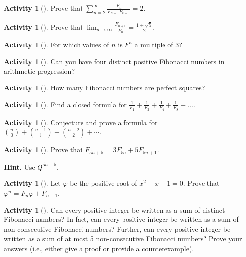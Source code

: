 \documentclass[10pt,]{book}
\theoremstyle{plain}
\theoremstyle{definition}
\theoremstyle{definition}
\theoremstyle{definition}
\newtheorem{activity}[project]{Activity}
\numberwithin{equation}{chapter}
\begin{document}
\begin{activity}[]\label{activity-155}
\hypertarget{p-978}{}%
Prove that \(\sum_{n = 2}^{\infty}\frac{F_{n}}{F_{n - 1}F_{n + 1}} = 2.\)%
\end{activity}
\begin{activity}[]\label{activity-156}
\hypertarget{p-979}{}%
Prove that \(\lim_{n\to\infty}\frac{F_{n + 1}}{F_{n}} = \frac{1 + \sqrt{5}}{2}.\)%
\end{activity}
\begin{activity}[]\label{activity-157}
\hypertarget{p-980}{}%
For which values of \(n\) is \(F^{n}\) a multiple of 3?%
\end{activity}
\begin{activity}[]\label{activity-158}
\hypertarget{p-981}{}%
Can you have four distinct positive Fibonacci numbers in arithmetic progression?%
\end{activity}
\begin{activity}[]\label{activity-159}
\hypertarget{p-982}{}%
How many Fibonacci numbers are perfect squares?%
\end{activity}
\begin{activity}[]\label{activity-160}
\hypertarget{p-983}{}%
Find a closed formula for \(\frac{1}{F_{1}} + \frac{1}{F_{2}} + \frac{1}{F_{4}} + \frac{1}{F_{8}} + \ldots.\)%
\end{activity}
\begin{activity}[]\label{activity-161}
\hypertarget{p-984}{}%
Conjecture and prove a formula for \(\binom{n}{0} + \binom{n-1}{1} + \binom{n-2}{2} + \cdots\).%
\end{activity}
\begin{activity}[]\label{activity-162}
\hypertarget{p-985}{}%
Prove that \(F_{5n + 5} = 3F_{5n} + 5F_{5n + 1}\).%
\par\smallskip%
\noindent\textbf{Hint}.\hypertarget{hint-112}{}\quad%
\hypertarget{p-986}{}%
Use \(Q^{5n + 5}\).%
\end{activity}
\begin{activity}[]\label{activity-163}
\hypertarget{p-987}{}%
Let \(\varphi\) be the positive root of \(x^{2} - x - 1 = 0\). Prove that \(\varphi^{n} = F_{n}\varphi + F_{n - 1}\).%
\end{activity}
\begin{activity}[]\label{activity-164}
\hypertarget{p-988}{}%
Can every positive integer be written as a sum of distinct Fibonacci numbers?  In fact, can every positive integer be written as a sum of non-consecutive Fibonacci numbers?  Further, can every positive integer be written as a sum of at most 5 non-consecutive Fibonacci numbers?  Prove your answers (i.e., either give a proof or provide a counterexample).%
\end{activity}
\typeout{************************************************}
\typeout{************************************************}
\end{document}
